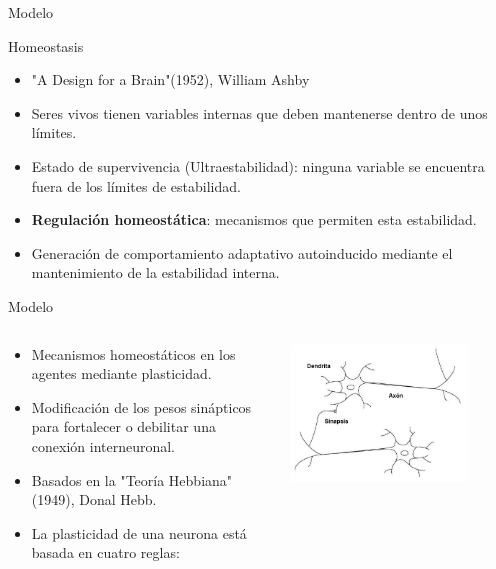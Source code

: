 \documentclass[aspectratio=169]{beamer}
\begin{document}
\begin{frame}{Modelo}
\begin{block}{Homeostasis}
\begin{itemize}
  \item "A Design for a Brain"(1952), William Ashby
  \item Seres vivos tienen variables internas que deben mantenerse dentro de unos límites.
  \item Estado de supervivencia (Ultraestabilidad): ninguna variable se encuentra fuera de los límites de estabilidad.
  \item \textbf{Regulación homeostática}: mecanismos que permiten esta estabilidad.
  \item Generación de comportamiento adaptativo autoinducido mediante el mantenimiento de la estabilidad interna.
\end{itemize}
\end{block}
\end{frame}

\begin{frame}{Modelo}
  \begin{columns}
    \begin{column}{0.5\textwidth}
        \begin{itemize}
          \item Mecanismos homeostáticos en los agentes mediante plasticidad.
          \item Modificación de los pesos sinápticos para fortalecer o debilitar una conexión interneuronal.
          \item Basados en la "Teoría Hebbiana" (1949), Donal Hebb.
            \item La plasticidad de una neurona está basada en cuatro reglas:
        \end{itemize}
    \end{column}
    \begin{column}{0.5\textwidth}
      \includegraphics[width=0.8\textwidth,height=.50\textheight]{Imagenes/Neurona}
    \end{column}
  \end{columns}

\end{frame}
\end{document}
